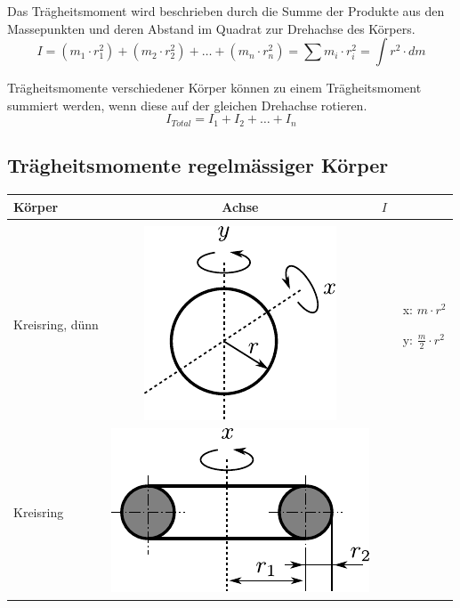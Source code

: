 Das Trägheitsmoment wird beschrieben durch die Summe der 
Produkte aus den Massepunkten und deren Abstand im Quadrat zur 
Drehachse des Körpers.
\[ \boxed{
	I = \left(m_1 \cdot r_1^2 \right)
		+ \left( m_2 \cdot r_2^2 \right)
		+ \dots 
		+ \left( m_n \cdot r_n^2 \right)
		= \sum m_i \cdot r_i^2
		= \int r^2 \cdot dm
} \]

\noindent
Trägheitsmomente verschiedener Körper können zu einem Trägheitsmoment
summiert werden, wenn diese auf der gleichen Drehachse rotieren.
\[ \boxed{
	I_{Total} = I_1 + I_2 + \dots + I_n
} \]

\newpage
\subsection{Trägheitsmomente regelmässiger Körper}

\begin{table}[h!]
\centering
\begin{tabular}{m{2cm} c m{}}
Körper	& Achse	& $I$ \\
\hline
& & \\
Kreisring, dünn &
	\begin{minipage}{0.3\textwidth}
	\centering
	\includegraphics[scale=\traegscale]{../fig/traeg-kreisring-duenn.pdf}
	\end{minipage} &
		\begin{itemize}
		\item[x:] $m \cdot r^2$
		\item[y:] $\frac{m}{2} \cdot r^2$
		\end{itemize} \\
Kreisring &
	\begin{minipage}{0.3\textwidth}
	\centering
	\includegraphics[scale=\traegscale]{../fig/traeg-kreisring.pdf}

\end{minipage}
\end{tabular}
\end{table}

